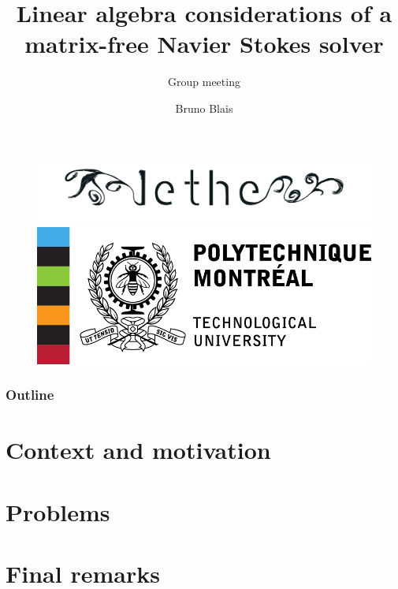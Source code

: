 \documentclass[t, 9pt,xcolor=dvipsnames]{beamer}
\title{\textbf{Linear algebra considerations of a matrix-free Navier Stokes solver}}
\subtitle{Group meeting}
\author{Bruno Blais}
\begin{document}
	\begin{frame}
	\vspace{0.5cm}
		\begin{figure}
	  		\includegraphics[scale = 0.12]{images/logo_lethe.png}\hspace*{0.2cm}
	  		\includegraphics[scale = 0.4]{images/logo-poly.jpg}
		\end{figure}
		\titlepage
	\end{frame}
	
	\begin{frame}
		\frametitle{\textbf{Outline}}
		\tableofcontents
	\end{frame}
	
	\section{Context and motivation}
	
	
	\section{Problems}
	
	

    	
	\section{Final remarks}
    
	
	
	\nocite{*} %
	    

    \appendix
\end{document}
